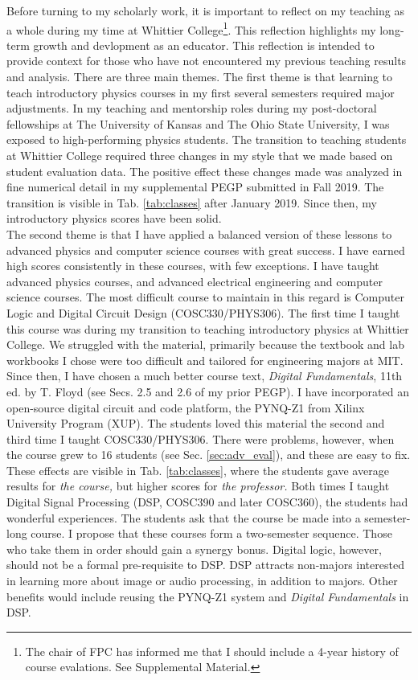 \documentclass[../../../main.tex]{subfiles}
\begin{document}
Before turning to my scholarly work, it is important to reflect on my teaching as a whole during my time at Whittier College\footnote{The chair of FPC has informed me that I should include a 4-year history of course evalations.  See Supplemental Material.}.  This reflection highlights my long-term growth and devlopment as an educator.  This reflection is intended to provide context for those who have not encountered my previous teaching results and analysis.  There are three main themes.  The first theme is that learning to teach introductory physics courses in my first several semesters required major adjustments.  In my teaching and mentorship roles during my post-doctoral fellowships at The University of Kansas and The Ohio State University, I was exposed to high-performing physics students.  The transition to teaching students at Whittier College required three changes in my style that we made based on student evaluation data.  The positive effect these changes made was analyzed in fine numerical detail in my supplemental PEGP submitted in Fall 2019.  The transition is visible in Tab. \ref{tab:classes} after January 2019. Since then, my introductory physics scores have been solid.
\\
\vspace{0.25cm}
The second theme is that I have applied a balanced version of these lessons to advanced physics and computer science courses with great success.  I have earned high scores consistently in these courses, with few exceptions.  I have taught advanced physics courses, and advanced electrical engineering and computer science courses.  The most difficult course to maintain in this regard is Computer Logic and Digital Circuit Design (COSC330/PHYS306).  The first time I taught this course was during my transition to teaching introductory physics at Whittier College.  We struggled with the material, primarily because the textbook and lab workbooks I chose were too difficult and tailored for engineering majors at MIT.
\\
\vspace{0.25cm}
Since then, I have chosen a much better course text, \textit{Digital Fundamentals}, 11th ed. by T. Floyd \cite{digitalFund} (see Secs. 2.5 and 2.6 of my prior PEGP).  I have incorporated an open-source digital circuit and code platform, the PYNQ-Z1 from Xilinx University Program (XUP).  The students loved this material the second and third time I taught COSC330/PHYS306.  There were problems, however, when the course grew to 16 students (see Sec. \ref{sec:adv_eval}), and these are easy to fix.  These effects are visible in Tab. \ref{tab:classes}, where the students gave average results for \textit{the course,} but higher scores for \textit{the professor.}  Both times I taught Digital Signal Processing (DSP, COSC390 and later COSC360), the students had wonderful experiences.  The students ask that the course be made into a semester-long course.  I propose that these courses form a two-semester sequence.  Those who take them in order should gain a synergy bonus.  Digital logic, however, should not be a formal pre-requisite to DSP.  DSP attracts non-majors interested in learning more about image or audio processing, in addition to majors.  Other benefits would include reusing the PYNQ-Z1 system and \textit{Digital Fundamentals} in DSP.
\end{document}
